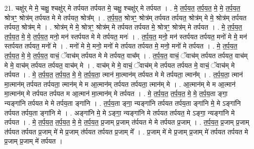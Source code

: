 \documentclass[17pt]{extarticle}
\begin{document}
21. चक्षु॑र् मे मे॒ चक्षु॒ श्चक्षु॑र् मे तर्पयत तर्पयत मे॒ चक्षु॒ श्चक्षु॑र् मे तर्पयत । . मे॒ त॒र्प॒य॒त॒ त॒र्प॒य॒त॒ मे॒ मे॒ त॒र्प॒य॒त॒ श्रोत्रꣳ॒॒ श्रोत्र॑म् तर्पयत मे मे तर्पयत॒ श्रोत्र᳚म् । . त॒र्प॒य॒त॒ श्रोत्रꣳ॒॒ श्रोत्र॑म् तर्पयत तर्पयत॒ श्रोत्र॑म् मे मे॒ श्रोत्र॑म् तर्पयत तर्पयत॒ श्रोत्र॑म् मे । . श्रोत्र॑म् मे मे॒ श्रोत्रꣳ॒॒ श्रोत्र॑म् मे तर्पयत तर्पयत मे॒ श्रोत्रꣳ॒॒ श्रोत्र॑म् मे तर्पयत । . मे॒ त॒र्प॒य॒त॒ त॒र्प॒य॒त॒ मे॒ मे॒ त॒र्प॒य॒त॒ मनो॒ मन॑ स्तर्पयत मे मे तर्पयत॒ मनः॑ । . त॒र्प॒य॒त॒ मनो॒ मन॑ स्तर्पयत तर्पयत॒ मनो॑ मे मे॒ मन॑ स्तर्पयत तर्पयत॒ मनो॑ मे । . मनो॑ मे मे॒ मनो॒ मनो॑ मे तर्पयत तर्पयत मे॒ मनो॒ मनो॑ मे तर्पयत । . मे॒ त॒र्प॒य॒त॒ त॒र्प॒य॒त॒ मे॒ मे॒ त॒र्प॒य॒त॒ वाचं॒ ॅवाच॑म् तर्पयत मे मे तर्पयत॒ वाच᳚म् । . त॒र्प॒य॒त॒ वाचं॒ ॅवाच॑म् तर्पयत तर्पयत॒ वाच॑म् मे मे॒ वाच॑म् तर्पयत तर्पयत॒ वाच॑म् मे । . वाच॑म् मे मे॒ वाचं॒ ॅवाच॑म् मे तर्पयत तर्पयत मे॒ वाचं॒ ॅवाच॑म् मे तर्पयत । . मे॒ त॒र्प॒य॒त॒ त॒र्प॒य॒त॒ मे॒ मे॒ त॒र्प॒य॒ता॒ त्मान॑ मा॒त्मान॑म् तर्पयत मे मे तर्पयता॒ त्मान᳚म् । . त॒र्प॒य॒ता॒ त्मान॑ मा॒त्मान॑म् तर्पयत तर्पयता॒ त्मान॑म् मे म आ॒त्मान॑म् तर्पयत तर्पयता॒ त्मान॑म् मे । . आ॒त्मान॑म् मे म आ॒त्मान॑ मा॒त्मान॑म् मे तर्पयत तर्पयत म आ॒त्मान॑ मा॒त्मान॑म् मे तर्पयत । . मे॒ त॒र्प॒य॒त॒ त॒र्प॒य॒त॒ मे॒ मे॒ त॒र्प॒य॒ता ङ्गा॒ न्यङ्गा॑नि तर्पयत मे मे तर्पय॒ता ङ्गा॑नि । . त॒र्प॒य॒ता ङ्गा॒ न्यङ्गा॑नि तर्पयत तर्पय॒ता ङ्गा॑नि मे॒ मे ऽङ्गा॑नि तर्पयत तर्पय॒ता ङ्गा॑नि मे । . अङ्गा॑नि मे॒ मे ऽङ्गा॒ न्यङ्गा॑नि मे तर्पयत तर्पयत॒ मे ऽङ्गा॒ न्यङ्गा॑नि मे तर्पयत । . मे॒ त॒र्प॒य॒त॒ त॒र्प॒य॒त॒ मे॒ मे॒ त॒र्प॒य॒त॒ प्र॒जाम् प्र॒जाम् त॑र्पयत मे मे तर्पयत प्र॒जाम् । . त॒र्प॒य॒त॒ प्र॒जाम् प्र॒जाम् त॑र्पयत तर्पयत प्र॒जाम् मे॑ मे प्र॒जाम् त॑र्पयत तर्पयत प्र॒जाम् मे᳚ । . प्र॒जाम् मे॑ मे प्र॒जाम् प्र॒जाम् मे॑ तर्पयत तर्पयत मे प्र॒जाम् प्र॒जाम् मे॑ तर्पयत । \newline
\end{document}
